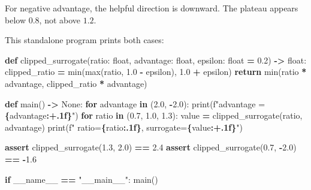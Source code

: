 \documentclass[
  american,
  11pt,
  letterpaper,
]{article}
\newenvironment{Shaded}{\begin{snugshade}}{\end{snugshade}}
\newcommand{\BuiltInTok}[1]{#1}
\newcommand{\ControlFlowTok}[1]{\textcolor[rgb]{0.13,0.29,0.53}{\textbf{#1}}}
\newcommand{\FloatTok}[1]{\textcolor[rgb]{0.00,0.00,0.81}{#1}}
\newcommand{\KeywordTok}[1]{\textcolor[rgb]{0.13,0.29,0.53}{\textbf{#1}}}
\newcommand{\NormalTok}[1]{#1}
\newcommand{\OperatorTok}[1]{\textcolor[rgb]{0.81,0.36,0.00}{\textbf{#1}}}
\newcommand{\SpecialCharTok}[1]{\textcolor[rgb]{0.81,0.36,0.00}{\textbf{#1}}}
\newcommand{\SpecialStringTok}[1]{\textcolor[rgb]{0.31,0.60,0.02}{#1}}
\newcommand{\StringTok}[1]{\textcolor[rgb]{0.31,0.60,0.02}{#1}}
\newcommand{\VariableTok}[1]{\textcolor[rgb]{0.00,0.00,0.00}{#1}}
\renewenvironment{Shaded}{\par\smallskip}{\par\smallskip}
\begin{document}
For negative advantage, the helpful direction is downward. The plateau
appears below \(0.8\), not above \(1.2\).

This standalone program prints both cases:

\begin{Shaded}
\begin{Highlighting}[]
\KeywordTok{def}\NormalTok{ clipped\_surrogate(ratio: }\BuiltInTok{float}\NormalTok{, advantage: }\BuiltInTok{float}\NormalTok{, epsilon: }\BuiltInTok{float} \OperatorTok{=} \FloatTok{0.2}\NormalTok{) }\OperatorTok{{-}\textgreater{}} \BuiltInTok{float}\NormalTok{:}
\NormalTok{    clipped\_ratio }\OperatorTok{=} \BuiltInTok{min}\NormalTok{(}\BuiltInTok{max}\NormalTok{(ratio, }\FloatTok{1.0} \OperatorTok{{-}}\NormalTok{ epsilon), }\FloatTok{1.0} \OperatorTok{+}\NormalTok{ epsilon)}
    \ControlFlowTok{return} \BuiltInTok{min}\NormalTok{(ratio }\OperatorTok{*}\NormalTok{ advantage, clipped\_ratio }\OperatorTok{*}\NormalTok{ advantage)}


\KeywordTok{def}\NormalTok{ main() }\OperatorTok{{-}\textgreater{}} \VariableTok{None}\NormalTok{:}
    \ControlFlowTok{for}\NormalTok{ advantage }\KeywordTok{in}\NormalTok{ (}\FloatTok{2.0}\NormalTok{, }\OperatorTok{{-}}\FloatTok{2.0}\NormalTok{):}
        \BuiltInTok{print}\NormalTok{(}\SpecialStringTok{f"advantage = }\SpecialCharTok{\{}\NormalTok{advantage}\SpecialCharTok{:+.1f\}}\SpecialStringTok{"}\NormalTok{)}
        \ControlFlowTok{for}\NormalTok{ ratio }\KeywordTok{in}\NormalTok{ (}\FloatTok{0.7}\NormalTok{, }\FloatTok{1.0}\NormalTok{, }\FloatTok{1.3}\NormalTok{):}
\NormalTok{            value }\OperatorTok{=}\NormalTok{ clipped\_surrogate(ratio, advantage)}
            \BuiltInTok{print}\NormalTok{(}\SpecialStringTok{f"  ratio=}\SpecialCharTok{\{}\NormalTok{ratio}\SpecialCharTok{:.1f\}}\SpecialStringTok{, surrogate=}\SpecialCharTok{\{}\NormalTok{value}\SpecialCharTok{:+.1f\}}\SpecialStringTok{"}\NormalTok{)}

    \ControlFlowTok{assert}\NormalTok{ clipped\_surrogate(}\FloatTok{1.3}\NormalTok{, }\FloatTok{2.0}\NormalTok{) }\OperatorTok{==} \FloatTok{2.4}
    \ControlFlowTok{assert}\NormalTok{ clipped\_surrogate(}\FloatTok{0.7}\NormalTok{, }\OperatorTok{{-}}\FloatTok{2.0}\NormalTok{) }\OperatorTok{==} \OperatorTok{{-}}\FloatTok{1.6}


\ControlFlowTok{if} \VariableTok{\_\_name\_\_} \OperatorTok{==} \StringTok{"\_\_main\_\_"}\NormalTok{:}
\NormalTok{    main()}
\end{Highlighting}
\end{Shaded}
\end{document}
